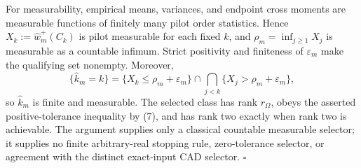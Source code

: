 For measurability, empirical means, variances, and endpoint cross moments are measurable functions of finitely many pilot order statistics.  Hence \(X_k:=\widehat w_m^+(C_k)\) is pilot measurable for each fixed \(k\), and \(\rho_m=\inf_{j\ge1}X_j\) is measurable as a countable infimum.  Strict positivity and finiteness of \(\varepsilon_m\) make the qualifying set nonempty.  Moreover,
\[
\{\widehat k_m=k\}
=\{X_k\le\rho_m+\varepsilon_m\}
\cap\bigcap_{j<k}\{X_j>\rho_m+\varepsilon_m\},
\tag{8}
\]
so \(\widehat k_m\) is finite and measurable.  The selected class has rank \(r_\Omega\), obeys the asserted positive-tolerance inequality by (7), and has rank two exactly when rank two is achievable.  The argument supplies only a classical countable measurable selector; it supplies no finite arbitrary-real stopping rule, zero-tolerance selector, or agreement with the distinct exact-input CAD selector. \(\square\)